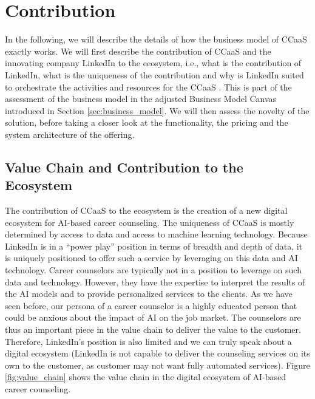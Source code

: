 \section{Contribution}
\label{sec:contribution}

In the following, we will describe the details of how the business model of CCaaS exactly works.
We will first describe the contribution of CCaaS and the innovating company LinkedIn to the ecosystem,
i.e., what is the contribution of LinkedIn, what is the uniqueness of the contribution and why is 
LinkedIn suited to orchestrate the activities and resources for the CCaaS
\citep[p.~200-203]{schwafertsLectureStrategicBusiness2023}. This is part of the assessment of the
business model in the adjusted Business Model Canvas introduced in Section \ref{sec:business_model}.
We will then assess the novelty of the solution, before taking a closer look at the functionality, the
pricing and the system architecture of the offering.

\subsection{Value Chain and Contribution to the Ecosystem}

The contribution of CCaaS to the ecosystem is the creation of a new digital ecosystem for AI-based
career counseling. The uniqueness of CCaaS is mostly determined by access to data and access to
machine learning technology. Because LinkedIn is in a ``power play'' position in terms of breadth and
depth of data, it is uniquely positioned to offer such a service by leveraging on this data and AI
technology. Career counselors are typically not in a position to leverage on such data and technology. However,
they have the expertise to interpret the results of the AI models and to provide personalized services 
to the clients. As we have seen before, our persona of a career counselor is a highly educated person
that could be anxious about the impact of AI on the job market. The counselors are thus an important 
piece in the value chain to deliver the value to the customer. Therefore, LinkedIn's position is also 
limited and we can truly speak about a digital ecosystem (LinkedIn is not capable to deliver the 
counseling services on its own to the customer, as customer may not want fully automated services). 
Figure \ref*{fig:value_chain} shows the value chain in the digital ecosystem of AI-based career 
counseling.

